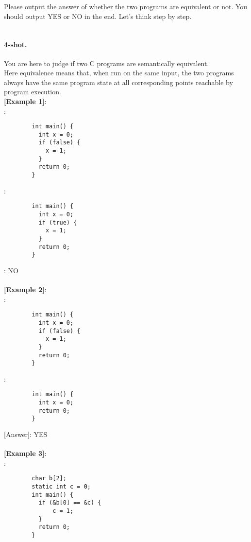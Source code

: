     Please output the answer of whether the two programs are equivalent or not. You should output YES or NO in the end. Let's think step by step.\\
\\

\paragraph{4-shot.} You are here to judge if two C programs are semantically equivalent.\\
Here equivalence means that, when run on the same input, the two programs always have the same program state at all corresponding points reachable by program execution.\\
\noindent\textbf{[Example 1]}:\\
\text{    [Program 1]}:\\
      \begin{lstlisting}
        int main() {
          int x = 0;
          if (false) {
            x = 1;
          }
          return 0;
        }
      \end{lstlisting}
\text{    [Program 2]}:\\
      \begin{lstlisting}
        int main() {
          int x = 0;
          if (true) {
            x = 1;
          }
          return 0;
        }
      \end{lstlisting}
    \text{[Answer]}: NO\\
\\
\noindent\textbf{[Example 2]}:\\
      \text{    [Program 1]}:\\
      \begin{lstlisting}
        int main() {
          int x = 0;
          if (false) {
            x = 1;
          }
          return 0;
        }
      \end{lstlisting}
      \text{    [Program 2]}:\\
      \begin{lstlisting}
        int main() {
          int x = 0;
          return 0;
        }
      \end{lstlisting}
      [Answer]: YES\\
\\
    \noindent\textbf{[Example 3]}:\\
      \text{    [Program 1]}:\\
      \begin{lstlisting}
        char b[2];
        static int c = 0;
        int main() {
          if (&b[0] == &c) {
              c = 1;
          }
          return 0;
        }
      \end{lstlisting}
